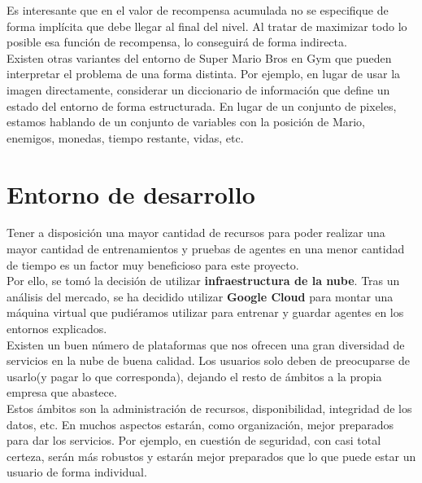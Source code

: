 \documentclass[11pt,fleqn]{book} %
\begin{document}
Es interesante que en el valor de recompensa acumulada no se especifique de forma implícita que debe llegar al final del nivel. Al tratar de maximizar todo lo posible esa función de recompensa, lo conseguirá de forma indirecta. \\


Existen otras variantes del entorno de Super Mario Bros en Gym que pueden interpretar el problema de una forma distinta. Por ejemplo, en lugar de usar la imagen directamente, considerar un diccionario de información que define un estado del entorno de forma estructurada. En lugar de un conjunto de pixeles, estamos hablando de un conjunto de variables con la posición de Mario, enemigos, monedas, tiempo restante, vidas, etc.

\chapter{Entorno de desarrollo}\label{sec:cloud}

Tener a disposición una mayor cantidad de recursos para poder realizar una mayor cantidad de entrenamientos y pruebas de agentes en una menor cantidad de tiempo es un factor muy beneficioso para este proyecto. \\

Por ello, se tomó la decisión de utilizar \textbf{infraestructura de la nube}. Tras un análisis del mercado, se ha decidido utilizar \textbf{Google Cloud} para montar una máquina virtual que pudiéramos utilizar para entrenar y guardar agentes en los entornos explicados.\\

Existen un buen número de plataformas que nos ofrecen una gran diversidad de servicios en la nube de buena calidad. Los usuarios solo deben de preocuparse de usarlo(y pagar lo que corresponda), dejando el resto de ámbitos a la propia empresa que abastece. \\

Estos ámbitos son la administración de recursos, disponibilidad, integridad de los datos, etc. En muchos aspectos estarán, como organización, mejor preparados para dar los servicios. Por ejemplo, en cuestión de seguridad, con casi total certeza, serán más robustos y estarán mejor preparados que lo que puede estar un usuario de forma individual. \\
\end{document}
